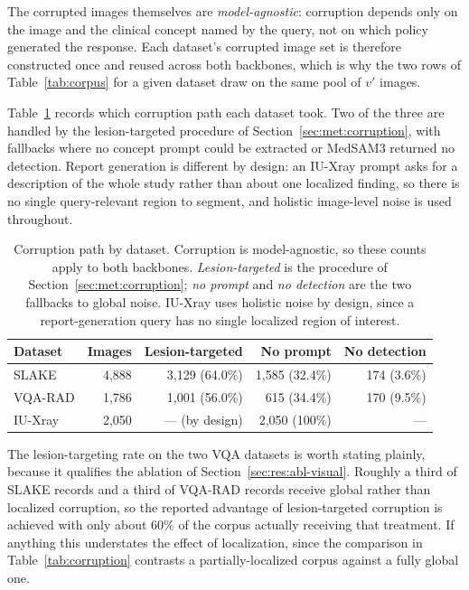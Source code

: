 The corrupted images themselves are \emph{model-agnostic}: corruption depends only on the image and the clinical concept named by the query, not on which policy generated the response. Each dataset's corrupted image set is therefore constructed once and reused across both backbones, which is why the two rows of Table~\ref{tab:corpus} for a given dataset draw on the same pool of $v'$ images.

Table~\ref{tab:corruption_paths} records which corruption path each dataset took. Two of the three are handled by the lesion-targeted procedure of Section~\ref{sec:met:corruption}, with fallbacks where no concept prompt could be extracted or MedSAM3 returned no detection. Report generation is different by design: an IU-Xray prompt asks for a description of the whole study rather than about one localized finding, so there is no single query-relevant region to segment, and holistic image-level noise is used throughout.

\begin{table}[ht]
\centering
\small
\caption{Corruption path by dataset. Corruption is model-agnostic, so these counts apply to both backbones. \emph{Lesion-targeted} is the procedure of Section~\ref{sec:met:corruption}; \emph{no prompt} and \emph{no detection} are the two fallbacks to global noise. IU-Xray uses holistic noise by design, since a report-generation query has no single localized region of interest.}
\label{tab:corruption_paths}
\begin{tabular}{lrrrr}
\toprule
\textbf{Dataset} & \textbf{Images} & \textbf{Lesion-targeted} & \textbf{No prompt} & \textbf{No detection} \\
\midrule
SLAKE   & 4{,}888 & 3{,}129 (64.0\%) & 1{,}585 (32.4\%) & 174 (3.6\%) \\
VQA-RAD & 1{,}786 & 1{,}001 (56.0\%) & 615 (34.4\%)     & 170 (9.5\%) \\
IU-Xray & 2{,}050 & --- (by design)  & 2{,}050 (100\%)  & --- \\
\bottomrule
\end{tabular}
\end{table}

The lesion-targeting rate on the two VQA datasets is worth stating plainly, because it qualifies the ablation of Section~\ref{sec:res:abl-visual}. Roughly a third of SLAKE records and a third of VQA-RAD records receive global rather than localized corruption, so the reported advantage of lesion-targeted corruption is achieved with only about $60\%$ of the corpus actually receiving that treatment. If anything this understates the effect of localization, since the comparison in Table~\ref{tab:corruption} contrasts a partially-localized corpus against a fully global one.

